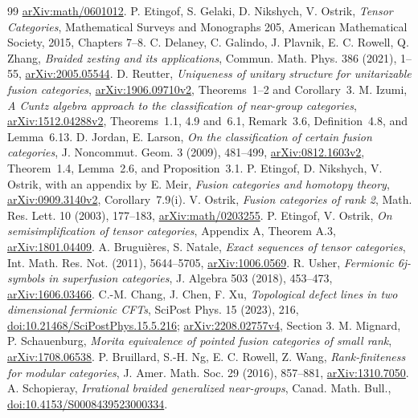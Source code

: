 \documentclass[11pt]{article}
\begin{document}
\begin{thebibliography}{99}
\href{https://arxiv.org/abs/math/0601012}{arXiv:math/0601012}.
 P. Etingof, S. Gelaki, D. Nikshych, V. Ostrik,
\emph{Tensor Categories}, Mathematical Surveys and Monographs 205,
American Mathematical Society, 2015, Chapters 7--8.
 C. Delaney, C. Galindo, J. Plavnik, E. C. Rowell, Q. Zhang,
\emph{Braided zesting and its applications}, Commun. Math. Phys. 386
(2021), 1--55, \href{https://arxiv.org/abs/2005.05544}{arXiv:2005.05544}.
 D. Reutter, \emph{Uniqueness of unitary structure for
unitarizable fusion categories},
\href{https://arxiv.org/abs/1906.09710v2}{arXiv:1906.09710v2},
Theorems~1--2 and Corollary~3.
 M. Izumi, \emph{A Cuntz algebra approach to the
classification of near-group categories},
\href{https://arxiv.org/abs/1512.04288v2}{arXiv:1512.04288v2},
Theorems~1.1, 4.9 and~6.1, Remark~3.6, Definition~4.8, and Lemma~6.13.
 D. Jordan, E. Larson, \emph{On the classification
of certain fusion categories}, J. Noncommut. Geom. 3 (2009), 481--499,
\href{https://arxiv.org/abs/0812.1603v2}{arXiv:0812.1603v2},
Theorem~1.4, Lemma~2.6, and Proposition~3.1.
 P. Etingof, D. Nikshych, V. Ostrik,
with an appendix by E. Meir, \emph{Fusion categories and homotopy theory},
\href{https://arxiv.org/abs/0909.3140v2}{arXiv:0909.3140v2},
Corollary~7.9(i).
 V. Ostrik, \emph{Fusion categories of rank 2},
Math. Res. Lett. 10 (2003), 177--183,
\href{https://arxiv.org/abs/math/0203255}{arXiv:math/0203255}.
 P. Etingof, V. Ostrik,
\emph{On semisimplification of tensor categories}, Appendix A, Theorem A.3,
\href{https://arxiv.org/abs/1801.04409}{arXiv:1801.04409}.
 A. Brugui\`eres, S. Natale,
\emph{Exact sequences of tensor categories}, Int. Math. Res. Not. (2011),
5644--5705, \href{https://arxiv.org/abs/1006.0569}{arXiv:1006.0569}.
 R. Usher, \emph{Fermionic 6j-symbols in superfusion categories},
J. Algebra 503 (2018), 453--473,
\href{https://arxiv.org/abs/1606.03466}{arXiv:1606.03466}.
 C.-M. Chang, J. Chen, F. Xu,
\emph{Topological defect lines in two dimensional fermionic CFTs},
SciPost Phys. 15 (2023), 216,
\href{https://doi.org/10.21468/SciPostPhys.15.5.216}{doi:10.21468/SciPostPhys.15.5.216};
\href{https://arxiv.org/abs/2208.02757v4}{arXiv:2208.02757v4}, Section 3.
 M. Mignard, P. Schauenburg,
\emph{Morita equivalence of pointed fusion categories of small rank},
\href{https://arxiv.org/abs/1708.06538}{arXiv:1708.06538}.
 P. Bruillard, S.-H. Ng, E. C. Rowell, Z. Wang,
\emph{Rank-finiteness for modular categories}, J. Amer. Math. Soc. 29 (2016),
857--881, \href{https://arxiv.org/abs/1310.7050}{arXiv:1310.7050}.
 A. Schopieray,
\emph{Irrational braided generalized near-groups},
Canad. Math. Bull., \href{https://doi.org/10.4153/S0008439523000334}{doi:10.4153/S0008439523000334}.
\end{thebibliography}
\end{document}
